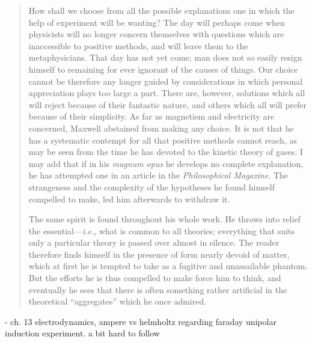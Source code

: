\documentclass{article}
\begin{document}
\begin{quote}
    How shall we choose from all the possible explanations one in which the help of experiment will be wanting?  The day will perhaps come when physicists will no longer concern themselves with questions which are inaccessible to positive methods, and will leave them to the metaphysicians.  That day has not yet come; man does not so easily resign himself to remaining for ever ignorant of the causes of things.  Our choice cannot be therefore any longer guided by considerations in which personal appreciation plays too large a part.  There are, however, solutions which all will reject because of their fantastic nature, and others which all will prefer because of their simplicity.  As far as magnetism and electricity are concerned, Maxwell abstained from making any choice.  It is not that he has a systematic contempt for all that positive methods cannot reach, as may be seen from the time he has devoted to the kinetic theory of gases.  I may add that if in his \emph{magnum opus} he develops no complete explanation, he has attempted one in an article in the \emph{Philosophical Magazine}.  The strangeness and the complexity of the hypotheses he found himself compelled to make, led him afterwards to withdraw it.  
    
    The same spirit is found throughout his whole work.  He throws into relief the essential---\emph{i.e.}, what is common to all theories; everything that suits only a particular theory is passed over almost in silence.  The reader therefore finds himself in the presence of form nearly devoid of matter, which at first he is tempted to take as a fugitive and unassailable phantom.  But the efforts he is thus compelled to make force him to think, and eventually he sees that there is often something rather artificial in the theoretical ``aggregates'' which he once admired.
    
    \citep[p. 217-224]{Poincare1952}
\end{quote}

- ch. 13 electrodynamics, ampere vs helmholtz regarding faraday unipolar induction experiment.  a bit hard to follow
\end{document}
